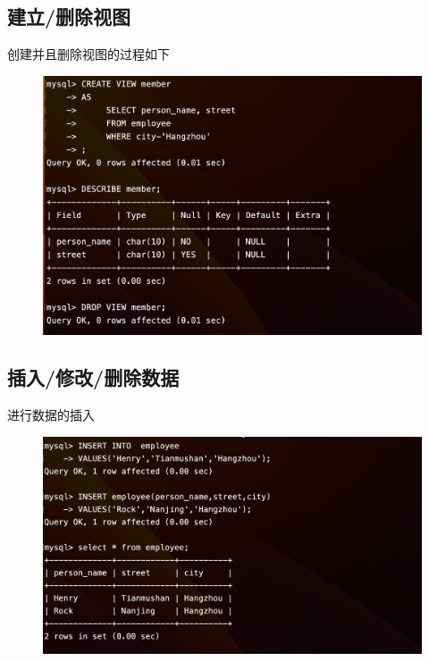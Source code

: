 \documentclass{article}
\begin{document}
\subsection*{建立/删除视图}

创建并且删除视图的过程如下

\begin{figure}[H]
        \centering
        \includegraphics[width=1\textwidth]{lab2/5.png}
        \end{figure}


\subsection*{插入/修改/删除数据}

进行数据的插入

\begin{figure}[H]
    \centering
    \includegraphics[width=1\textwidth]{lab2/6.png}
    \end{figure}
\end{document}
